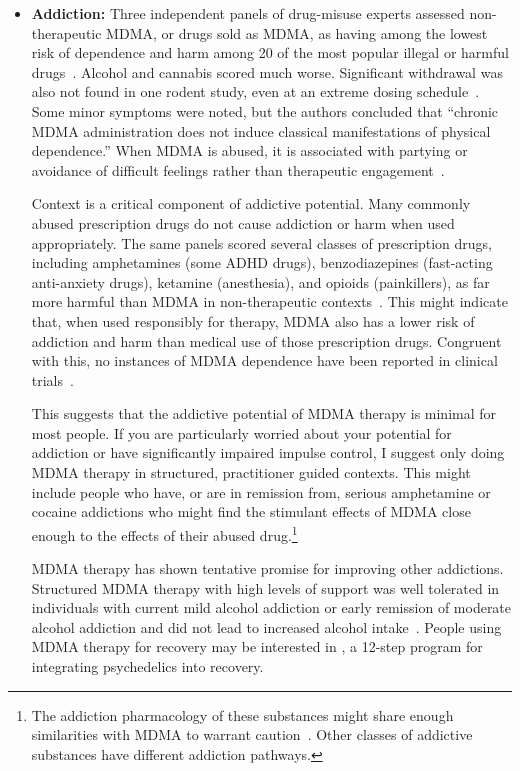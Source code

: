 \documentclass[11pt,oneside]{book}
\let\cite\parencite
\begin{document}
\begin{itemize}
    \item \textbf{Addiction:}
    Three independent panels of drug-misuse experts assessed non-therapeutic MDMA, or drugs sold as MDMA, as having among the lowest risk of dependence and harm among 20 of the most popular illegal or harmful drugs~\cite{nuttDrugHarms,bonomoHarms,crossinHarms}. Alcohol and cannabis scored much worse. Significant withdrawal was also not found in one rodent study, even at an extreme dosing schedule~\cite{robledoDependence}. Some minor symptoms were noted, but the authors concluded that \enquote{chronic MDMA administration does not induce classical manifestations of physical dependence.} When MDMA is abused, it is associated with partying or avoidance of difficult feelings rather than therapeutic engagement~\cite{erowidAbuse}.

    Context is a critical component of addictive potential. Many commonly abused prescription drugs do not cause addiction or harm when used appropriately. The same panels scored several classes of prescription drugs, including amphetamines (some ADHD drugs), benzodiazepines (fast-acting anti-anxiety drugs), ketamine (anesthesia), and opioids (painkillers), as far more harmful than MDMA in non-therapeutic contexts~\cite{nuttDrugHarms,crossinHarms,bonomoHarms}. This might indicate that, when used responsibly for therapy, MDMA also has a lower risk of addiction and harm than medical use of those prescription drugs. Congruent with this, no instances of MDMA dependence have been reported in clinical trials~\cite{colcott2024side}.

    This suggests that the addictive potential of MDMA therapy is minimal for most people. If you are particularly worried about your potential for addiction or have significantly impaired impulse control, I suggest only doing MDMA therapy in structured, practitioner guided contexts. This might include people who have, or are in remission from, serious amphetamine or cocaine addictions who might find the stimulant effects of MDMA close enough to the effects of their abused drug.\footnote{The addiction pharmacology of these substances might share enough similarities with MDMA to warrant caution~\cite{nutt2015dopamine}. Other classes of addictive substances have different addiction pathways.}

    MDMA therapy has shown tentative promise for improving other addictions. Structured MDMA therapy with high levels of support was well tolerated in individuals with current mild alcohol addiction or early remission of moderate alcohol addiction and did not lead to increased alcohol intake~\cite{nicholasAlcohol}. People using MDMA therapy for recovery may be interested in \textcite{recoveryPsychedelics}, a 12-step program for integrating psychedelics into recovery.


\end{itemize}
\end{document}
